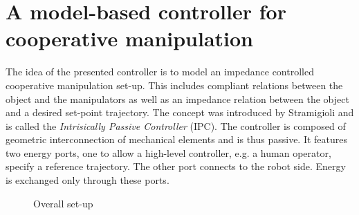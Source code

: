 \documentclass[a4paper,twoside, openright,12pt]{report}
\begin{document}

\section{A model-based controller for cooperative manipulation}
The idea of the presented controller is to model an impedance controlled cooperative manipulation set-up. This includes compliant relations between the object and the manipulators as well as an impedance relation between the object and a desired set-point trajectory. The concept was introduced by Stramigioli \cite{Stramigioli_01} and is called the \emph{Intrisically Passive Controller} (IPC). The controller is composed of geometric interconnection of mechanical elements and is thus passive. It features two energy ports, one to allow a high-level controller, e.g. a human operator, specify a reference trajectory. The other port connects to the robot side. Energy is exchanged only through these ports.
\begin{figure}[b!]
	\centering
	\sf\small
	\def\svgwidth{0.99\columnwidth}
	
	\caption{Overall set-up}
	\label{FIG:modelbasedcontrol}
\end{figure}
\end{document}
